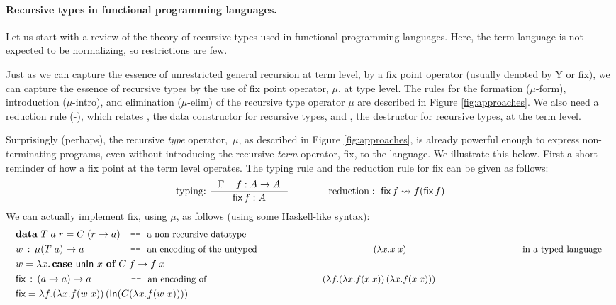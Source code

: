 \paragraph{Recursive types in functional programming languages.}
Let us start with a review of the theory of recursive types used
in functional programming languages. Here, the term
language is not expected to be normalizing, so restrictions are few.

Just as we can capture the essence of unrestricted general recursion at term
level, by a fix point operator (usually denoted by \textsf{Y} or \textsf{fix}),
we can capture the essence of recursive types by the
use of fix point operator, $\mu$, at type level. 
The rules for the formation {\small($\mu$-form)},
introduction {\small($\mu$-intro)}, and elimination {\small($\mu$-elim)} of
the recursive type operator $\mu$ are described in Figure \ref{fig:approaches}.
We also need a reduction rule {\small(\unIn-\In)}, which relates \In,
the data constructor for recursive types, and \unIn, the destructor for
recursive types, at the term level.

Surprisingly (perhaps), the recursive {\em type} operator,\ $\mu$, as described in
Figure \ref{fig:approaches}, is already powerful enough to express 
non-terminating programs, even without introducing the recursive {\em term}
operator, \textsf{fix}, to the language. We illustrate this below. First a 
short reminder of how a fix point at the term level operates. The typing rule
and the reduction rule for \textsf{fix} can be given as follows:
\[ \text{typing:}~ \inference{\Gamma |- f : A -> A}{\textsf{fix}\,f : A}
 \qquad\qquad
   \text{reduction}:~ \textsf{fix}\,f \rightsquigarrow f(\textsf{fix}\,f)
\]
We can actually implement \textsf{fix}, using $\mu$, as follows
(using some Haskell-like syntax):
\begin{align*}
& \textbf{data}~T\;a\;r = C\;(r -> a) \quad
          \texttt{-}\texttt{-}~\text{\small a non-recursive datatype} \\
& w \,:\, \mu(T\;a) -> a ~~ \qquad \qquad
          \texttt{-}\texttt{-}~\text{\small an encoding of the untyped
                                     $(\lambda x.x\;x)$
                                     in a typed language}~ \\
& w = \lambda x . \,\textbf{case}~\textsf{unIn}~x~\textbf{of}~C\;f -> f\;x \\
& \textsf{fix} \,:\, (a -> a) -> a \qquad \qquad
          \texttt{-}\texttt{-}~\text{\small an encoding of 
                                     $(\lambda f.(\lambda x.f(x\;x))\,
                                                 (\lambda x.f(x\;x)))$} \\
& \textsf{fix} = \lambda f. (\lambda x. f (w\;x))\,(\textsf{In}(C(\lambda x. f (w\;x))))
\end{align*}

